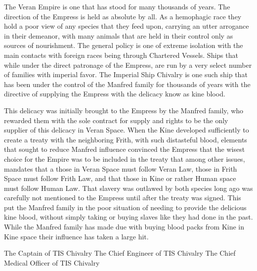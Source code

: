 \documentclass[blue]{guildcamp4}
\begin{document}
\name{\bVer{}}

The Veran Empire is one that has stood for many thousands of years. The direction of the Empress is held as absolute by all. As a hemophagic race they hold a poor view of any species that they feed upon, carrying an utter arrogance in their demeanor, with many animals that are held in their control only as sources of nourishment. The general policy is one of extreme isolation with the main contacts with foreign races being through Chartered Vessels. Ships that while under the direct patronage of the Empress, are run by a very select number of families with imperial favor. The Imperial Ship Chivalry is one such ship that has been under the control of the Manfred family for thousands of years with the directive of supplying the Empress with the delicacy know as kine blood. 

This delicacy was initially brought to the Empress by the Manfred family, who rewarded them with the sole contract for supply and rights to be the only supplier of this delicacy in Veran Space. When the Kine developed sufficiently to create a treaty with the neighboring Frith, with such distasteful blood, elements that sought to reduce Manfred influence convinced the Empress that the wisest choice for the Empire was to be included in the treaty that among other issues, mandates that a those in Veran Space must follow Veran Law, those in Frith Space must follow Frith Law, and that those in Kine or rather Human space must follow Human Law. That slavery was outlawed by both species long ago was carefully not mentioned to the Empress until after the treaty was signed. This put the Manfred family in the poor situation of needing to provide the delicious kine blood, without simply taking or buying slaves like they had done in the past. While the Manfred family has made due with buying blood packs from Kine in Kine space their influence has taken a large hit.






\begin{members}
	\member{\cVone{}} The Captain of TIS Chivalry
	\member{\cVtwo{}} The Chief Engineer of TIS Chivalry
	\member{\cVthree{}} The Chief Medical Officer of TIS Chivalry

\end{members}
\end{document}

